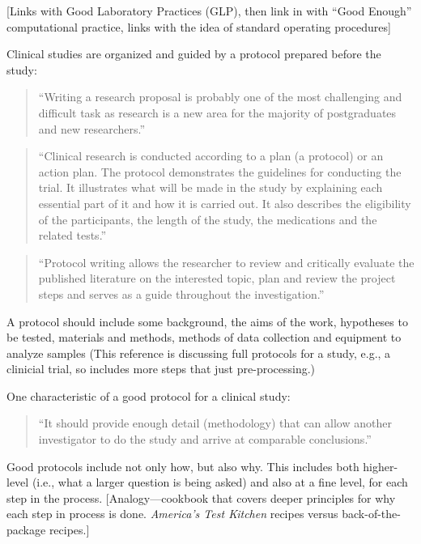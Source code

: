 \documentclass[]{tufte-book}
\begin{document}
{[}Links with Good Laboratory Practices (GLP), then link in with
``Good Enough'' computational practice, links with the idea of
standard operating procedures{]}

Clinical studies are organized and guided by a protocol prepared before the
study:

\begin{quote}
``Writing a research proposal is probably one of the most challenging and
difficult task as research is a new area for the majority of postgraduates and
new researchers.'' \citep{al2016protocol}
\end{quote}

\begin{quote}
``Clinical research is conducted according to a plan (a protocol) or an action plan. The protocol demonstrates the guidelines for conducting the trial. It illustrates what will be made in the study by explaining each essential part of it and how it is carried out. It also describes the eligibility of the participants, the length of the study, the medications and the related tests.'' \citep{al2016protocol}
\end{quote}

\begin{quote}
``Protocol writing allows the researcher to review and critically evaluate the published literature on the interested topic, plan and review the project steps and serves as a guide throughout the investigation.'' \citep{al2016protocol}
\end{quote}

A protocol should include some background, the aims of the work, hypotheses
to be tested, materials and methods, methods of data collection and
equipment to analyze samples \citep{al2016protocol} (This reference is discussing
full protocols for a study, e.g., a clinicial trial, so includes more steps
that just pre-processing.)

One characteristic of a good protocol for a clinical study:

\begin{quote}
``It should provide enough detail (methodology) that can allow another investigator to do the study and arrive at comparable conclusions.'' \citep{al2016protocol}
\end{quote}

Good protocols include not only how, but also why. This includes both
higher-level (i.e., what a larger question is being asked) and also at a
fine level, for each step in the process. {[}Analogy---cookbook that covers
deeper principles for why each step in process is done. \emph{America's Test Kitchen}
recipes versus back-of-the-package recipes.{]}
\end{document}
